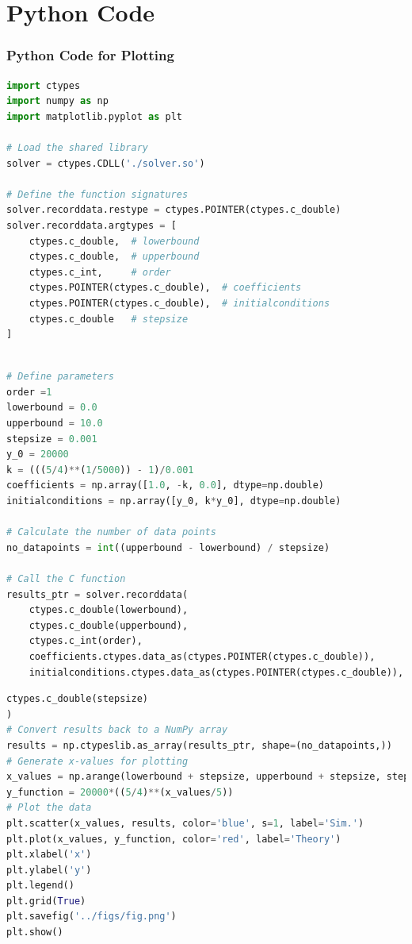 \documentclass{beamer}
\theoremstyle{remark}
\numberwithin{equation}{section}
\begin{document}
\section{Python Code}
\begin{frame}[fragile]
\frametitle{Python Code for Plotting}
\begin{lstlisting}[language=Python]
import ctypes
import numpy as np
import matplotlib.pyplot as plt

# Load the shared library
solver = ctypes.CDLL('./solver.so')

# Define the function signatures
solver.recorddata.restype = ctypes.POINTER(ctypes.c_double)
solver.recorddata.argtypes = [
    ctypes.c_double,  # lowerbound
    ctypes.c_double,  # upperbound
    ctypes.c_int,     # order
    ctypes.POINTER(ctypes.c_double),  # coefficients
    ctypes.POINTER(ctypes.c_double),  # initialconditions
    ctypes.c_double   # stepsize
]

\end{lstlisting}
\end{frame}
\begin{frame}[fragile]
\begin{lstlisting}[language=Python]

# Define parameters
order =1
lowerbound = 0.0
upperbound = 10.0
stepsize = 0.001
y_0 = 20000
k = (((5/4)**(1/5000)) - 1)/0.001
coefficients = np.array([1.0, -k, 0.0], dtype=np.double) 
initialconditions = np.array([y_0, k*y_0], dtype=np.double)

# Calculate the number of data points
no_datapoints = int((upperbound - lowerbound) / stepsize)

# Call the C function
results_ptr = solver.recorddata(
    ctypes.c_double(lowerbound),
    ctypes.c_double(upperbound),
    ctypes.c_int(order),
    coefficients.ctypes.data_as(ctypes.POINTER(ctypes.c_double)),
    initialconditions.ctypes.data_as(ctypes.POINTER(ctypes.c_double)),

\end{lstlisting}
\end{frame}
\begin{frame}[fragile]
\begin{lstlisting}[language=Python]
    ctypes.c_double(stepsize)
)
# Convert results back to a NumPy array
results = np.ctypeslib.as_array(results_ptr, shape=(no_datapoints,))
# Generate x-values for plotting
x_values = np.arange(lowerbound + stepsize, upperbound + stepsize, stepsize)
y_function = 20000*((5/4)**(x_values/5))
# Plot the data
plt.scatter(x_values, results, color='blue', s=1, label='Sim.')
plt.plot(x_values, y_function, color='red', label='Theory')
plt.xlabel('x')
plt.ylabel('y')
plt.legend()
plt.grid(True)
plt.savefig('../figs/fig.png')
plt.show()
\end{lstlisting}
\end{frame}
\end{document}
